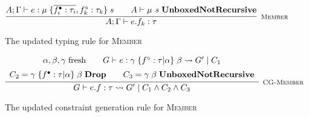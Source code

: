\begin{figure}
    \centering
    \[
        \infer[\textsc{\footnotesize{Member}}]{
            A;\Gamma \vdash e.f_k : \tau
        }{
            A;\Gamma \vdash e : \mu\; \{ \overline{f_i^\bullet : \tau_i}, f_k^\circ : \tau_k \}\; s
            &\hspace{1em}
            A \vdash \mu \textit{ s } \textbf{UnboxedNotRecursive}
        }
    \]
    
    \caption{The updated typing rule for \textsc{Member}}
    \label{fig:membertypingrule}
\end{figure}

\begin{figure}
    \centering
    \[
        \infer[\textsc{\footnotesize{CG-Member}}]{
            G \vdash e.f : \tau \rightsquigarrow G'\; |\; C_1 \land C_2 \land C_3
        }{
            \begin{array}{c}
                \alpha, \beta, \gamma\; \text{fresh}
                \hspace{2em}
                G \vdash e : \gamma\; \{ f^\circ : \tau | \alpha \}\; \beta \rightsquigarrow G'\; |\; C_1 \\[5pt]
                C_2 = \gamma\; \{ f^\bullet : \tau | \alpha \}\; \beta\; \textbf{Drop}
                \hspace{2em}
                C_3 = \gamma\; \beta\; \textbf{UnboxedNotRecursive}
            \end{array}
        }
    \]
    
    \caption{The updated constraint generation rule for \textsc{Member}}
    \label{fig:memberconstraintgen}
\end{figure}

